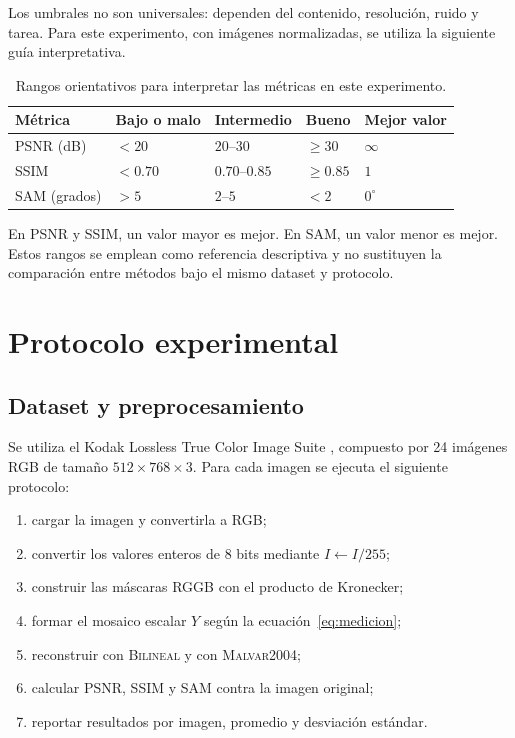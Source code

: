 \documentclass[11pt,a4paper]{article}
\newcommand{\bilinear}{\textsc{Bilineal}}
\newcommand{\malvar}{\textsc{Malvar2004}}
\begin{document}
Los umbrales no son universales: dependen del contenido, resolución, ruido y tarea. Para este experimento, con imágenes normalizadas, se utiliza la siguiente guía interpretativa.

\begin{table}[H]
\centering
\caption{Rangos orientativos para interpretar las métricas en este experimento.}
\label{tab:rangos}
\begin{tabular}{>{\raggedright\arraybackslash}p{2.2cm}p{2.8cm}p{2.8cm}p{2.8cm}p{2.2cm}}
\toprule
Métrica & Bajo o malo & Intermedio & Bueno & Mejor valor \\
\midrule
PSNR (dB) & $<20$ & $20$--$30$ & $\geq30$ & $\infty$ \\
SSIM & $<0.70$ & $0.70$--$0.85$ & $\geq0.85$ & $1$ \\
SAM (grados) & $>5$ & $2$--$5$ & $<2$ & $0^\circ$ \\
\bottomrule
\end{tabular}
\end{table}

En PSNR y SSIM, un valor mayor es mejor. En SAM, un valor menor es mejor. Estos rangos se emplean como referencia descriptiva y no sustituyen la comparación entre métodos bajo el mismo dataset y protocolo.

\section{Protocolo experimental}

\subsection{Dataset y preprocesamiento}

Se utiliza el Kodak Lossless True Color Image Suite \cite{kodakdataset}, compuesto por 24 imágenes RGB de tamaño $512\times768\times3$. Para cada imagen se ejecuta el siguiente protocolo:

\begin{enumerate}[label=\arabic*.]
    \item cargar la imagen y convertirla a RGB;
    \item convertir los valores enteros de 8 bits mediante $I\leftarrow I/255$;
    \item construir las máscaras RGGB con el producto de Kronecker;
    \item formar el mosaico escalar $Y$ según la ecuación~\eqref{eq:medicion};
    \item reconstruir con \bilinear{} y con \malvar{};
    \item calcular PSNR, SSIM y SAM contra la imagen original;
    \item reportar resultados por imagen, promedio y desviación estándar.
\end{enumerate}
\end{document}

